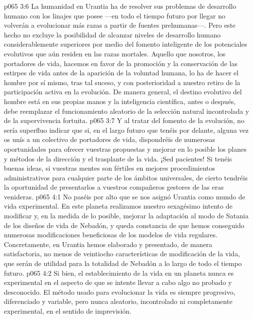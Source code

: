 \vs p065 3:6 \pc La humanidad en Urantia ha de resolver sus problemas de desarrollo humano con los linajes que posee ---en todo el tiempo futuro por llegar no volverán a evolucionar más razas a partir de fuentes prehumanas---. Pero este hecho no excluye la posibilidad de alcanzar niveles de desarrollo humano considerablemente superiores por medio del fomento inteligente de los potenciales evolutivos que aún residen en las razas mortales. Aquello que nosotros, los portadores de vida, hacemos en favor de la promoción y la conservación de las estirpes de vida antes de la aparición de la voluntad humana, lo ha de hacer el hombre por sí mismo, tras tal suceso, y con posterioridad a nuestro retiro de la participación activa en la evolución. De manera general, el destino evolutivo del hombre está en sus propias manos y la inteligencia científica, antes o después, debe reemplazar el funcionamiento aleatorio de la selección natural incontrolada y de la supervivencia fortuita.
\vs p065 3:7 Y al tratar del fomento de la evolución, no sería superfluo indicar que si, en el largo futuro que tenéis por delante, alguna vez os unís a un colectivo de portadores de vida, dispondréis de numerosas oportunidades para ofrecer vuestras propuestas y mejorar en lo posible los planes y métodos de la dirección y el trasplante de la vida. ¡Sed pacientes! Si tenéis buenas ideas, si vuestras mentes son fértiles en mejores procedimientos administrativos para cualquier parte de los ámbitos universales, de cierto tendréis la oportunidad de presentarlos a vuestros compañeros gestores de las eras venideras.
\vs p065 4:1 No paséis por alto que se nos asignó Urantia como mundo de vida experimental. En este planeta realizamos nuestro sexagésimo intento de modificar y, en la medida de lo posible, mejorar la adaptación al modo de Satania de los diseños de vida de Nebadón, y queda constancia de que hemos conseguido numerosas modificaciones beneficiosas de los modelos de vida regulares. Concretamente, en Urantia hemos elaborado y presentado, de manera satisfactoria, no menos de veintiocho características de modificación de la vida, que serán de utilidad para la totalidad de Nebadón a lo largo de todo el tiempo futuro.
\vs p065 4:2 Si bien, el establecimiento de la vida en un planeta nunca es experimental en el aspecto de que se intente llevar a cabo algo no probado y desconocido. El método usado para evolucionar la vida es siempre progresivo, diferenciado y variable, pero nunca aleatorio, incontrolado ni completamente experimental, en el sentido de imprevisión.
